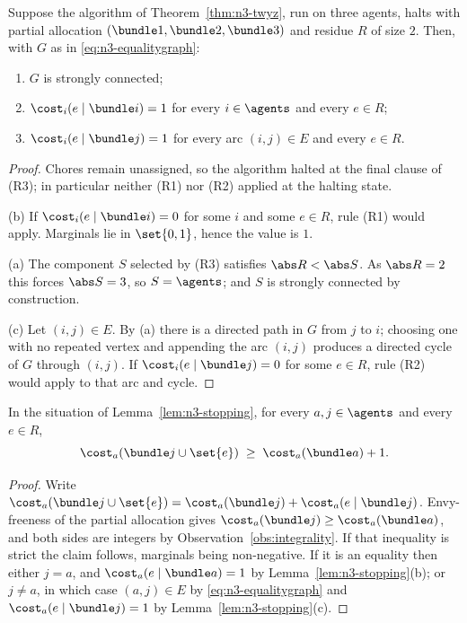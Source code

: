 \begin{lemma}
\label{lem:n3-stopping}
Suppose the algorithm of Theorem~\ref{thm:n3-twyz}, run on three agents, halts
with partial allocation $(\bundle1,\bundle2,\bundle3)$ and residue $R$ of size
$2$. Then, with $G$ as in \eqref{eq:n3-equalitygraph}:
\begin{enumerate}
  \item[(a)] $G$ is strongly connected;
  \item[(b)] $\cost_i(e \mid \bundle i) = 1$ for every $i \in \agents$ and
        every $e \in R$;
  \item[(c)] $\cost_i(e \mid \bundle j) = 1$ for every arc $(i,j) \in E$ and
        every $e \in R$.
\end{enumerate}
\end{lemma}

\begin{proof}
Chores remain unassigned, so the algorithm halted at the final clause of (R3);
in particular neither (R1) nor (R2) applied at the halting state.

(b) If $\cost_i(e \mid \bundle i) = 0$ for some $i$ and some $e \in R$, rule
(R1) would apply. Marginals lie in $\set{0,1}$, hence the value is $1$.

(a) The component $S$ selected by (R3) satisfies $\abs R < \abs S$. As
$\abs R = 2$ this forces $\abs S = 3$, so $S = \agents$; and $S$ is strongly
connected by construction.

(c) Let $(i,j) \in E$. By (a) there is a directed path in $G$ from $j$ to $i$;
choosing one with no repeated vertex and appending the arc $(i,j)$ produces a
directed cycle of $G$ through $(i,j)$. If $\cost_i(e \mid \bundle j) = 0$ for
some $e \in R$, rule (R2) would apply to that arc and cycle.
\end{proof}

\begin{lemma}
\label{lem:n3-expensive}
In the situation of Lemma~\ref{lem:n3-stopping}, for every $a, j \in \agents$
and every $e \in R$,
\[
  \cost_a(\bundle j \cup \set{e}) \;\ge\; \cost_a(\bundle a) + 1 .
\]
\end{lemma}

\begin{proof}
Write $\cost_a(\bundle j \cup \set{e}) = \cost_a(\bundle j) +
\cost_a(e \mid \bundle j)$. Envy-freeness of the partial allocation gives
$\cost_a(\bundle j) \ge \cost_a(\bundle a)$, and both sides are integers by
Observation~\ref{obs:integrality}. If that inequality is strict the claim
follows, marginals being non-negative. If it is an equality then either
$j = a$, and $\cost_a(e \mid \bundle a) = 1$ by
Lemma~\ref{lem:n3-stopping}(b); or $j \ne a$, in which case $(a,j) \in E$ by
\eqref{eq:n3-equalitygraph} and $\cost_a(e \mid \bundle j) = 1$ by
Lemma~\ref{lem:n3-stopping}(c).
\end{proof}

